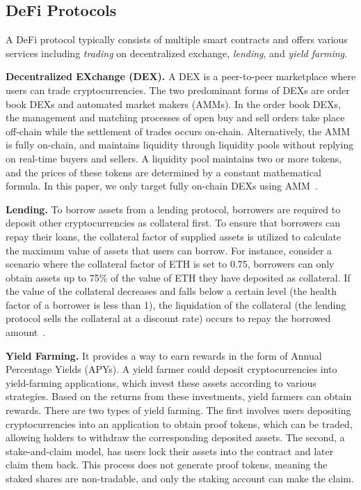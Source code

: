 \subsection{DeFi Protocols}
\label{sec:backg_defiProtocol}

A DeFi protocol typically consists of multiple smart contracts and offers various services including \textit{trading} on decentralized exchange, \textit{lending}, and \textit{yield farming}. %

\noindent\textbf{Decentralized EXchange (DEX).}
A DEX is a peer-to-peer marketplace where users can trade cryptocurrencies. The two predominant forms of DEXs are order book DEXs and automated market makers (AMMs). In the order book DEXs, the management and matching processes of open buy and sell orders take place off-chain while the settlement of trades occurs on-chain. Alternatively, the AMM is fully on-chain, and maintains liquidity through liquidity pools without replying on real-time buyers and sellers. A liquidity pool maintains two or more tokens, and the prices of these tokens are determined by a constant mathematical formula. In this paper, we only target fully on-chain DEXs using AMM~\cite{DEX_Intro_1,DEX_Intro_2}.

\noindent\textbf{Lending.}
To borrow assets from a lending protocol, borrowers are required to deposit other cryptocurrencies as collateral first. To ensure that borrowers can repay their loans, the collateral factor of supplied assets is utilized to calculate the maximum value of assets that users can borrow. For instance, consider a scenario where the collateral factor of ETH is set to 0.75, borrowers can only obtain assets up to 75\% of the value of ETH they have deposited as collateral. If the value of the collateral decreases and falls below a certain level (the health factor of a borrower is less than 1), the liquidation of the collateral (the lending protocol sells the collateral at a discount rate) occurs to repay the borrowed amount~\cite{Lending_Intro_2}.

\noindent\textbf{Yield Farming.}
It provides a way to earn rewards in the form of Annual Percentage Yields (APYs). A yield farmer could deposit cryptocurrencies into yield-farming applications, which invest these assets according to various strategies. Based on the returns from these investments, yield farmers can obtain rewards.
There are two types of yield farming. The first involves users depositing cryptocurrencies into an application to obtain proof tokens, which can be traded, allowing holders to withdraw the corresponding deposited assets. The second, a stake-and-claim model, has users lock their assets into the contract and later claim them back. This process does not generate proof tokens, meaning the staked shares are non-tradable, and only the staking account can make the claim.


